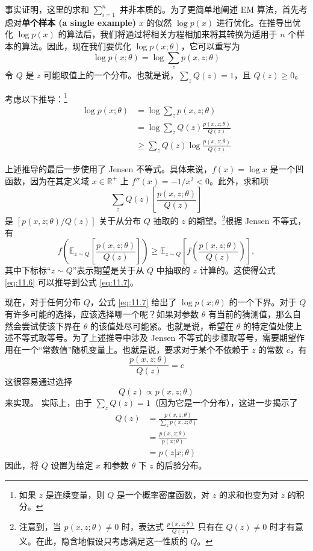 事实证明，这里的求和 $\sum_{i=1}^n$ 并非本质的。为了更简单地阐述 EM 算法，首先考虑对\textbf{单个样本 (a single example)} $x$ 的似然 $\log p(x)$ 进行优化。在推导出优化 $\log p(x)$ 的算法后，我们将通过将相关方程相加来将其转换为适用于 $n$ 个样本的算法。因此，现在我们要优化 $\log p(x; \theta)$，它可以重写为
\begin{equation}
    \log p(x; \theta) = \log \sum_z p(x, z; \theta)
    \label{eq:11.5}
\end{equation}
令 $Q$ 是 $z$ 可能取值上的一个分布。也就是说，$\sum_z Q(z) = 1$，且 $Q(z) \geq 0$。

考虑以下推导：\footnote{如果 $z$ 是连续变量，则 $Q$ 是一个概率密度函数，对 $z$ 的求和也变为对 $z$ 的积分。}
\begin{align}
    \log p(x; \theta) &= \log \sum_z p(x, z; \theta) \nonumber \\
    &= \log \sum_z Q(z) \frac{p(x, z; \theta)}{Q(z)}
    \label{eq:11.6} \\
    &\geq \sum_z Q(z) \log \frac{p(x, z; \theta)}{Q(z)}
    \label{eq:11.7}
\end{align}

上述推导的最后一步使用了 Jensen 不等式。具体来说，$f(x) = \log x$ 是一个凹函数，因为在其定义域 $x\in \mathbb{R}^+$ 上 $f''(x) = -1/x^2 < 0$。此外，求和项
\[
    \sum_z Q(z) \left[ \frac{p(x, z; \theta)}{Q(z)} \right]
\]
是 $[p(x, z; \theta)/Q(z)]$ 关于从分布 $Q$ 抽取的 $z$ 的期望。\footnote{注意到，当 $p(x, z; \theta) \neq 0$ 时，表达式 $\frac{p(x, z; \theta)}{Q(z)}$ 只有在 $Q(z) \neq 0$ 时才有意义。在此，隐含地假设只考虑满足这一性质的 $Q$。}根据 Jensen 不等式，有
\[
    f\left( \mathbb{E}_{z \sim Q}\left[ \frac{p(x, z; \theta)}{Q(z)} \right] \right) \geq \mathbb{E}_{z \sim Q}\left[ f\left( \frac{p(x, z; \theta)}{Q(z)} \right) \right],
\]
其中下标标“$z \sim Q$”表示期望是关于从 $Q$ 中抽取的 $z$ 计算的。这使得公式 \eqref{eq:11.6} 可以推导到公式 \eqref{eq:11.7}。

现在，对于任何分布 $Q$，公式 \eqref{eq:11.7} 给出了 $\log p(x; \theta)$ 的一个下界。对于 $Q$ 有许多可能的选择，应该选择哪一个呢？如果对参数 $\theta$ 有当前的猜测值，那么自然会尝试使该下界在 $\theta$ 的该值处尽可能紧。也就是说，希望在 $\theta$ 的特定值处使上述不等式取等号。为了上述推导中涉及 Jensen 不等式的步骤取等号，需要期望作用在一个“常数值”随机变量上。也就是说，要求对于某个不依赖于 $z$ 的常数 $c$，有
\[
    \frac{p(x, z; \theta)}{Q(z)} = c
\]
这很容易通过选择
\[
    Q(z) \propto p(x, z; \theta)
\]
来实现。
实际上，由于 $\sum_z Q(z) = 1$（因为它是一个分布），这进一步揭示了
\begin{align}
    Q(z) &= \frac{p(x, z; \theta)}{\sum_z p(x, z; \theta)}
    \nonumber\\
    &= \frac{p(x, z; \theta)}{p(x; \theta)} 
    \nonumber\\
    &= p(z|x; \theta)
    \label{eq:11.8}
\end{align}
因此，将 $Q$ 设置为给定 $x$ 和参数 $\theta$ 下 $z$ 的后验分布。

